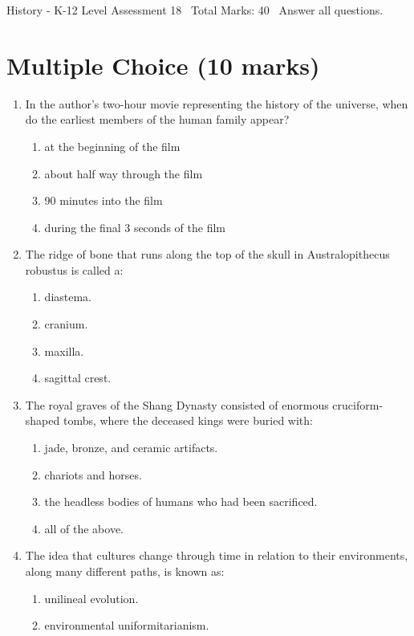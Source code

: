 \documentclass[12pt]{article}
\begin{document}
\begin{center}
History - K-12 Level Assessment 18 \
Total Marks: 40 \
Answer all questions.
\end{center}

\section*{Multiple Choice (10 marks)}
\begin{enumerate}[label=\arabic*.]
\item In the author's two-hour movie representing the history of the universe, when do the earliest members of the human family appear?
\begin{enumerate}[label=(\alph*)]
    \item at the beginning of the film
    \item about half way through the film
    \item 90 minutes into the film
    \item during the final 3 seconds of the film
\end{enumerate}
\item The ridge of bone that runs along the top of the skull in Australopithecus robustus is called a:
\begin{enumerate}[label=(\alph*)]
    \item diastema.
    \item cranium.
    \item maxilla.
    \item sagittal crest.
\end{enumerate}
\item The royal graves of the Shang Dynasty consisted of enormous cruciform-shaped tombs, where the deceased kings were buried with:
\begin{enumerate}[label=(\alph*)]
    \item jade, bronze, and ceramic artifacts.
    \item chariots and horses.
    \item the headless bodies of humans who had been sacrificed.
    \item all of the above.
\end{enumerate}
\item The idea that cultures change through time in relation to their environments, along many different paths, is known as:
\begin{enumerate}[label=(\alph*)]
    \item unilineal evolution.
    \item environmental uniformitarianism.

\end{enumerate}
\end{enumerate}
\end{document}
